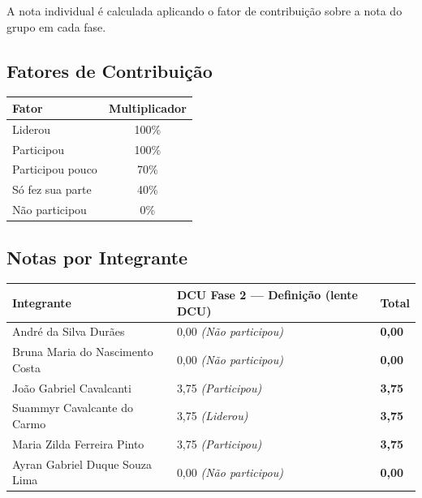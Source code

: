 \documentclass[
  sigconf,
  nonacm, %
  language=portuguese
]{acmart}
\begin{document}
A nota individual é calculada aplicando o fator de contribuição sobre a nota do grupo em cada fase.

\subsection{Fatores de Contribuição}

\begin{tabularx}{0.6\linewidth}{@{} X c @{}}
\toprule
\textbf{Fator} & \textbf{Multiplicador} \\
\midrule
Liderou & 100\% \\
Participou & 100\% \\
Participou pouco & 70\% \\
Só fez sua parte & 40\% \\
Não participou & 0\% \\
\bottomrule
\end{tabularx}

\vspace{1em}
\subsection{Notas por Integrante}

\begin{tabularx}{\linewidth}{@{} X X p{2.5cm} @{}}
\toprule
\textbf{Integrante} & \textbf{\small DCU Fase 2 — Definição (lente DCU)} & \textbf{Total} \\
\midrule
André da Silva Durães & 0,00 \textit{(Não participou)} & \textbf{0,00} \\
Bruna Maria do Nascimento Costa & 0,00 \textit{(Não participou)} & \textbf{0,00} \\
João Gabriel Cavalcanti & 3,75 \textit{(Participou)} & \textbf{3,75} \\
Suammyr Cavalcante do Carmo & 3,75 \textit{(Liderou)} & \textbf{3,75} \\
Maria Zilda Ferreira Pinto & 3,75 \textit{(Participou)} & \textbf{3,75} \\
Ayran Gabriel Duque Souza Lima & 0,00 \textit{(Não participou)} & \textbf{0,00} \\
\bottomrule
\end{tabularx}
\end{document}

